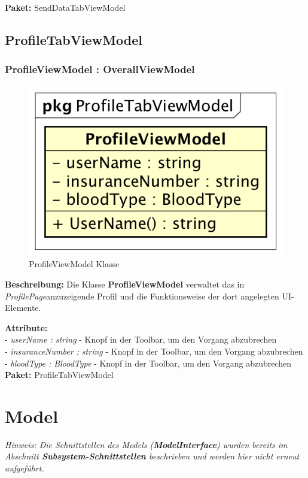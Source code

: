 \documentclass[a4paper]{scrreprt}
\begin{document}
\textbf{Paket:} SendDataTabViewModel

\subsection{ProfileTabViewModel}

\subsubsection{ProfileViewModel : OverallViewModel}
\begin{figure}[H]
\centering
\includegraphics[width=0.45\textheight]{graphics/Klassendiagramme/ViewModel/ProfileViewModel.png}
\caption{ProfileViewModel Klasse}
\end{figure}

\textbf{Beschreibung:} Die Klasse \textbf{ProfileViewModel} verwaltet das in \textit{ProfilePage}anzuzeigende Profil und die Funktionsweise der dort angelegten UI-Elemente.

\textbf{Attribute:}\\
- \textit{userName : string} - Knopf in der Toolbar, um den Vorgang abzubrechen\\
- \textit{insuranceNumber : string} - Knopf in der Toolbar, um den Vorgang abzubrechen\\
- \textit{bloodType : BloodType} - Knopf in der Toolbar, um den Vorgang abzubrechen\\

\textbf{Paket:} ProfileTabViewModel

\section{Model}
\textit{Hinweis: Die Schnittstellen des Models (\textbf{ModelInterface}) wurden bereits im Abschnitt \textbf{Subsystem-Schnittstellen} beschrieben und werden hier nicht erneut aufgeführt.}
\end{document}
